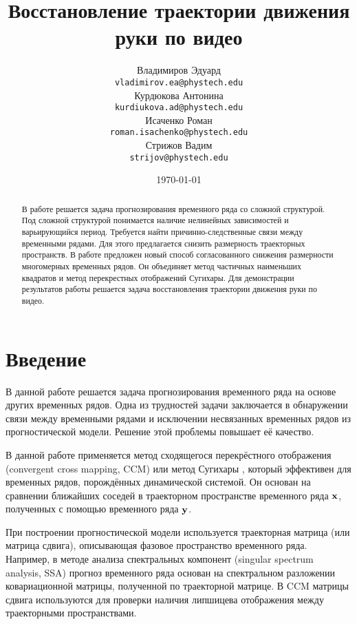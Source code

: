 \documentclass[a4paper, 12pt]{article}
\title{Восстановление траектории движения руки по видео}
\author{Владимиров Эдуард \\
	\texttt{vladimirov.ea@phystech.edu} \\
	
	\And
	Курдюкова Антонина \\
	\texttt{kurdiukova.ad@phystech.edu} \\

	\And
	Исаченко Роман \\
	\texttt{roman.isachenko@phystech.edu} \\
	
	\And
	Стрижов Вадим \\
	\texttt{strijov@phystech.edu}
}
\date{\today}
\begin{document}
\maketitle

\begin{abstract}
	В работе решается задача прогнозирования временного ряда со сложной структурой. Под сложной структурой понимается наличие нелинейных зависимостей и варьирующийся период. Требуется найти причинно-следственные связи между временными рядами. Для этого предлагается снизить размерность траекторных пространств. В работе предложен новый способ согласованного снижения размерности многомерных временных рядов. Он объединяет метод частичных наименьших квадратов и метод перекрестных отображений Сугихары. Для демонстрации результатов работы решается задача восстановления траектории движения руки по видео.
\end{abstract}



\section{Введение}

В данной работе решается задача прогнозирования временного ряда на основе других временных рядов. 
Одна из трудностей задачи заключается в обнаружении связи между временными рядами и исключении несвязанных временных рядов из прогностической модели. 
Решение этой проблемы повышает её качество.

В данной работе применяется метод сходящегося перекрёстного отображения (convergent cross mapping, CCM) или метод Сугихары \citep{Sugihara90, sugihara1990nonlinear}, который эффективен для временных рядов, порождённых динамической системой. 
Он основан на сравнении ближайших соседей в траекторном пространстве временного ряда $\mathbf{x}$, полученных с помощью временного ряда $\mathbf{y}$.

При построении прогностической модели используется траекторная матрица (или матрица сдвига), описывающая фазовое пространство временного ряда. 
Например, в методе анализа спектральных компонент (singular spectrum analysis, SSA) \citep{golyandina2005ssa, golyandina2001analysis, zhigljavsky2010singular} прогноз временного ряда основан на спектральном разложении ковариационной матрицы, полученной по траекторной матрице. 
В CCM матрицы сдвига используются для проверки наличия липшицева отображения между траекторными пространствами.
\end{document}

